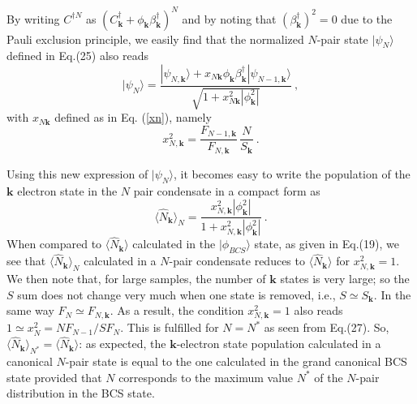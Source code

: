 \documentclass[twocolumn,showpacs]{revtex4}
\def\v#1{\mathbf{#1}}
\begin{document}
By writing $C^{\dag N}$ as $(C_{\v k}^\dag+\phi_{\v k}\beta_{\v k}^\dag)^N$ and by noting that $(\beta_{\v k}^\dag)^2=0$ due to the Pauli exclusion principle, we easily find that the normalized $N$-pair state $|\psi_N\rangle$ defined in Eq.(25) also reads
\begin{equation}
|\psi_N\rangle=\frac{|\psi_{N,\v k}\rangle+x_{N\v k}\phi_{\v k}\beta_{\v k}^\dag|\psi_{N-1,\v k}\rangle}{\sqrt{1+x_{N\v k}^2
|\phi_{\v k}^2|}}\ ,
\end{equation}
with  $x_{N\v k}$  defined as in Eq. (\ref{xn}), namely
\begin{equation}
x_{N,\v k}^2=\frac{F_{N-1,\v k}}{F_{N,\v k}}\,\frac{N}{S_{\v k}}\ .
\end{equation}
 
Using this new expression of $|\psi_N\rangle$, it becomes easy to write the population of the $\v k$ electron state in the $N$ pair condensate in a compact form as
\begin{equation}
 \langle\hat{N}_{\v{k}}\rangle_{N}=\frac{x_{N,\v k}^2|\phi_{\v k}^2|}{1+x_{N,\v k}^2|\phi_{\v k}^2|}\ .
\end{equation}
When compared to $ \langle\hat{N}_{\v{k}}\rangle$ calculated in the $|\phi_{BCS}\rangle$ state, as given in Eq.(19), we see that $ \langle\hat{N}_{\v{k}}\rangle_{N}$ calculated in a $N$-pair condensate reduces to $ \langle\hat{N}_{\v{k}}\rangle$ for $x_{N,\v k}^2=1$. We then note that, for large samples, the number of $\v k$ states is very large; so the $S$ sum does not change very much when one state is removed, i.e., $S\simeq S_{\v k}$. In the same way $F_N\simeq F_{N,\v k}$. As a result, the condition $x_{N,\v k}^2=1$ also reads $1\simeq x_N^2=NF_{N-1}/SF_N$. This is fulfilled for $N=N^\ast$ as seen from Eq.(27). So, $\langle\hat{N}_{\v{k}}\rangle_{N^\ast}= \langle\hat{N}_{\v{k}}\rangle$: as expected, the $\v k$-electron state population calculated in a canonical $N$-pair state is equal to the one calculated in the grand canonical BCS state provided that $N$ corresponds to the maximum value $N^\ast$ of the $N$-pair distribution in the BCS state.
\end{document}
